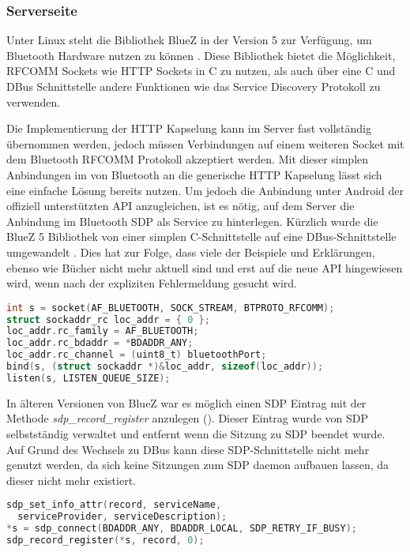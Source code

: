         \subsubsection{Serverseite}        
        Unter Linux steht die Bibliothek BlueZ in der Version 5 zur Verfügung, um Bluetooth Hardware nutzen zu können \cite{bluezMigration}. Diese Bibliothek bietet die Möglichkeit, RFCOMM Sockets wie HTTP Sockets in C zu nutzen, als auch über eine C und DBus Schnittstelle andere Funktionen wie das Service Discovery Protokoll zu verwenden.
        
        Die Implementierung der HTTP Kapselung kann im Server fast vollständig übernommen werden, jedoch müssen Verbindungen auf einem weiteren Socket mit dem Bluetooth RFCOMM Protokoll akzeptiert werden. Mit dieser simplen Anbindungen im  von Bluetooth an die generische HTTP Kapselung lässt sich eine einfache Lösung bereits nutzen. Um jedoch die Anbindung unter Android der offiziell unterstützten API anzugleichen, ist es nötig, auf dem Server die Anbindung im Bluetooth SDP als Service zu hinterlegen. Kürzlich wurde die BlueZ 5 Bibliothek von einer simplen C-Schnittstelle auf eine DBus-Schnittstelle umgewandelt \cite{BluezMigration}. Dies hat zur Folge, dass viele der Beispiele und Erklärungen, ebenso wie Bücher nicht mehr aktuell sind und erst auf die neue API hingewiesen wird, wenn nach der expliziten Fehlermeldung gesucht wird.

        \begin{lstlisting}[frame=bt, label={lst:bluetooth:socket}, language=C, caption=Verbindungsaufbau mit Bluetooth (Servercode in C)]
int s = socket(AF_BLUETOOTH, SOCK_STREAM, BTPROTO_RFCOMM);
struct sockaddr_rc loc_addr = { 0 };
loc_addr.rc_family = AF_BLUETOOTH;
loc_addr.rc_bdaddr = *BDADDR_ANY;
loc_addr.rc_channel = (uint8_t) bluetoothPort;
bind(s, (struct sockaddr *)&loc_addr, sizeof(loc_addr));
listen(s, LISTEN_QUEUE_SIZE);
        \end{lstlisting}        
        
        In älteren Versionen von BlueZ war es möglich einen SDP Eintrag mit der Methode {\it sdp\_record\_register} anzulegen (). Dieser Eintrag wurde von SDP selbstständig verwaltet und entfernt wenn die Sitzung zu SDP beendet wurde. Auf Grund des Wechsels zu DBus kann diese SDP-Schnittstelle nicht mehr genutzt werden, da sich keine Sitzungen zum SDP daemon aufbauen lassen, da dieser nicht mehr existiert.
        
        \begin{lstlisting}[frame=bt, label={lst:bluetooth:sdp}, language=C, caption=Veraltete Nutzung von SDP (Servercode in C)]
sdp_set_info_attr(record, serviceName,
  serviceProvider, serviceDescription);
*s = sdp_connect(BDADDR_ANY, BDADDR_LOCAL, SDP_RETRY_IF_BUSY);
sdp_record_register(*s, record, 0);
        \end{lstlisting}
        
